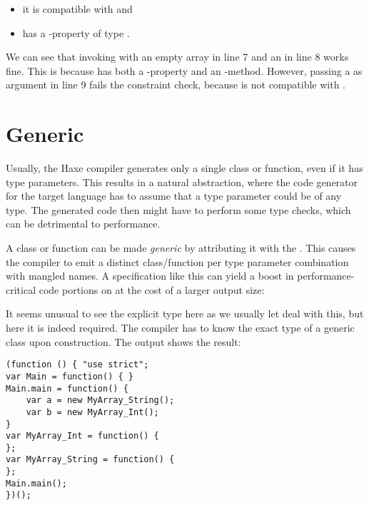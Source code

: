 \documentclass{haxe}
\begin{document}
\begin{itemize}
	\item it is compatible with  and
	\item has a -property of type .
\end{itemize}
We can see that invoking  with an empty array in line 7 and an  in line 8 works fine. This is because  has both a -property and an -method. However, passing a  as argument in line 9 fails the constraint check, because  is not compatible with . 


\section{Generic}
\label{type-system-generic}

Usually, the Haxe compiler generates only a single class or function, even if it has type parameters. This results in a natural abstraction, where the code generator for the target language has to assume that a type parameter could be of any type. The generated code then might have to perform some type checks, which can be detrimental to performance.

A class or function can be made \emph{generic} by attributing it with the  . This causes the compiler to emit a distinct class/function per type parameter combination with mangled names. A specification like this can yield a boost in performance-critical code portions on  at the cost of a larger output size:


It seems unusual to see the explicit type  here as we usually let  deal with this, but here it is indeed required. The compiler has to know the exact type of a generic class upon construction. The  output shows the result:

\begin{lstlisting}
(function () { "use strict";
var Main = function() { }
Main.main = function() {
	var a = new MyArray_String();
	var b = new MyArray_Int();
}
var MyArray_Int = function() {
};
var MyArray_String = function() {
};
Main.main();
})();
\end{lstlisting}
\end{document}
